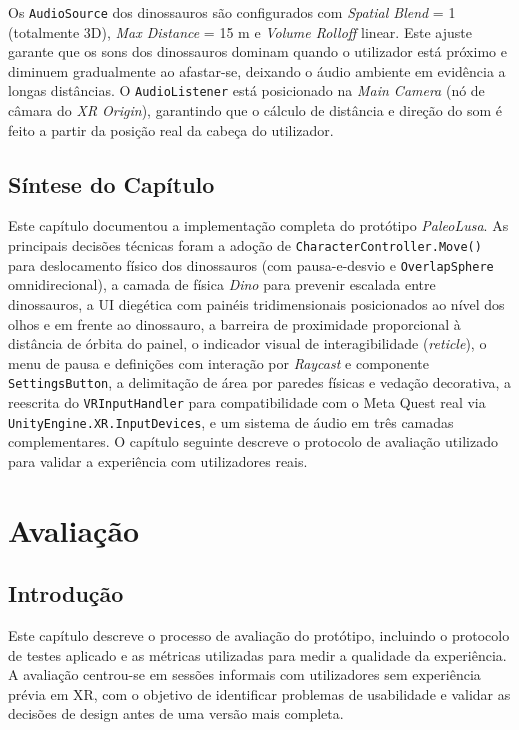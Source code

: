 \documentclass[a4paper,11pt]{report}
\newcommand{\code}[1]{\texttt{#1}}
\newcommand{\blankpage}{%
    \newpage
    \thispagestyle{empty}
    \mbox{}
    \newpage
}
\begin{document}
Os \code{AudioSource} dos dinossauros são configurados com \textit{Spatial Blend}
= 1 (totalmente 3D), \textit{Max Distance} = 15 m e \textit{Volume Rolloff} linear.
Este ajuste garante que os sons dos dinossauros dominam quando o utilizador está
próximo e diminuem gradualmente ao afastar-se, deixando o áudio ambiente em
evidência a longas distâncias. O \code{AudioListener} está posicionado na
\textit{Main Camera} (nó de câmara do \textit{XR Origin}), garantindo que o
cálculo de distância e direção do som é feito a partir da posição real da cabeça
do utilizador.

\section{Síntese do Capítulo}

Este capítulo documentou a implementação completa do protótipo \textit{PaleoLusa}.
As principais decisões técnicas foram a adoção de \code{CharacterController.Move()}
para deslocamento físico dos dinossauros (com pausa-e-desvio e \code{OverlapSphere}
omnidirecional), a camada de física \textit{Dino} para prevenir escalada entre
dinossauros, a UI diegética com painéis tridimensionais posicionados ao nível dos
olhos e em frente ao dinossauro, a barreira de proximidade proporcional à distância
de órbita do painel, o indicador visual de interagibilidade (\textit{reticle}),
o menu de pausa e definições com interação por \textit{Raycast} e componente
\code{SettingsButton}, a delimitação de área por paredes físicas e vedação
decorativa, a reescrita do \code{VRInputHandler} para compatibilidade com o
Meta Quest real via \code{UnityEngine.XR.InputDevices}, e um sistema de áudio
em três camadas complementares. O capítulo seguinte descreve o protocolo de
avaliação utilizado para validar a experiência com utilizadores reais.

\blankpage

\chapter{Avaliação}

\section{Introdução}

Este capítulo descreve o processo de avaliação do protótipo, incluindo o
protocolo de testes aplicado e as métricas utilizadas para medir a qualidade
da experiência. A avaliação centrou-se em sessões informais com utilizadores
sem experiência prévia em XR, com o objetivo de identificar problemas de
usabilidade e validar as decisões de design antes de uma versão mais completa.
\end{document}
